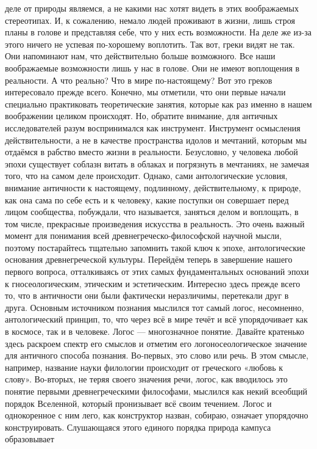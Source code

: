 деле от природы являемся, а не какими нас хотят видеть в этих воображаемых
стереотипах. И, к сожалению, немало людей проживают в жизни, лишь строя планы в
голове и представляя себе, что у них есть возможности. На деле же из-за этого
ничего не успевая по-хорошему воплотить. Так вот, греки видят не так. Они
напоминают нам, что действительно больше возможного. Все наши воображаемые
возможности лишь у нас в голове. Они не имеют воплощения в реальности. А что
реально? Что в мире по-настоящему? Вот это греков интересовало прежде всего.
Конечно, мы отметили, что они первые начали специально практиковать
теоретические занятия, которые как раз именно в нашем воображении целиком
происходят. Но, обратите внимание, для античных исследователей разум
воспринимался как инструмент. Инструмент осмысления действительности, а не в
качестве пространства идолов и мечтаний, которым мы отдаёмся в рабство вместо
жизни в реальности. Безусловно, у человека любой эпохи существует соблазн витать
в облаках и погрязнуть в мечтаниях, не замечая того, что на самом деле
происходит. Однако, сами антологические условия, внимание античности к
настоящему, подлинному, действительному, к природе, как она сама по себе есть и
к человеку, какие поступки он совершает перед лицом сообщества, побуждали, что
называется, заняться делом и воплощать, в том числе, прекрасные произведения
искусства в реальность. Это очень важный момент для понимания всей
древнегреческо-философской научной мысли, поэтому постарайтесь тщательно
запомнить такой ключ к эпохе, антологические основания древнегреческой культуры.
Перейдём теперь в завершение нашего первого вопроса, отталкиваясь от этих самых
фундаментальных оснований эпохи к гносеологическим, этическим и эстетическим.
Интересно здесь прежде всего то, что в античности они были фактически
неразличимы, перетекали друг в друга. Основным источником познания мыслился тот
самый логос, несомненно, антологический принцип, то, что через всё в мире течёт
и всё упорядочивает как в космосе, так и в человеке. Логос — многозначное
понятие. Давайте кратенько здесь раскроем спектр его смыслов и отметим его
логоносеологическое значение для античного способа познания. Во-первых, это
слово или речь. В этом смысле, например, название науки филологии происходит от
греческого «любовь к слову». Во-вторых, не теряя своего значения речи, логос,
как вводилось это понятие первыми древнегреческими философами, мыслился как
некий всеобщий порядок Вселенной, который пронизывает всё своим течением. Логос
и однокоренное с ним лего, как конструктор назван, собираю, означает упорядочно
конструировать. Слушающаяся этого единого порядка природа кампуса образовывает
